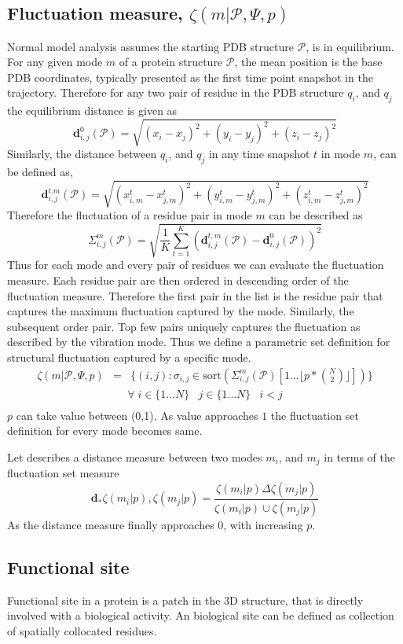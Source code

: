 \documentclass{article}
\begin{document}
\subsection{Fluctuation measure, $\zeta(m \vert \mathscr{P}, \Psi, p)$}
Normal model analysis assumes the starting PDB structure $\mathscr{P}$, is in equilibrium. For any given mode $m$ of a protein structure $\mathscr{P}$, the mean position is the base PDB coordinates, typically presented as the first time point snapshot in the trajectory. Therefore for any two pair of residue in the PDB structure $q_i$, and $q_j$ the equilibrium distance is given as 
\begin{equation*}
    \mathbf{d}^{0}_{i,j}(\mathscr{P}) = \sqrt{ (x_i - x_j)^2 + (y_i-y_j)^2 + (z_i-z_j)^2 }
\end{equation*}
Similarly, the distance between $q_i$, and $q_j$ in any time snapshot $t$ in mode $m$, can be defined as,
\begin{equation*}
    \mathbf{d}^{t.m}_{i,j}(\mathscr{P}) = \sqrt{ (x^{t}_{i,m} - x^{t}_{j,m})^2 + (y^{t}_{i,m} - y^{t}_{j,m})^2 + (z^{t}_{i,m} - z^{t}_{j,m})^2}
\end{equation*}
Therefore the fluctuation of a residue pair in mode $m$ can be described as 
\begin{equation*}
    \Sigma^{m}_{i,j}(\mathscr{P}) = \sqrt{ \dfrac{1}{K} \sum^{K}_{t=1} (\mathbf{d}^{t,m}_{i,j}(\mathscr{P}) - \mathbf{d}^{0}_{i,j}(\mathscr{P}))^2 }
\end{equation*}
 Thus for each mode and every pair of residues we can evaluate the fluctuation measure. Each residue pair are then ordered in descending order of the fluctuation measure. Therefore the first pair in the list is the residue pair that captures the maximum fluctuation captured by the mode. Similarly, the subsequent order pair. Top few pairs uniquely captures the fluctuation as described by the vibration mode. Thus we define a parametric set definition for structural fluctuation captured by a specific mode.
 \begin{eqnarray*}
     \zeta(m \vert \mathscr{P}, \Psi, p) & = & \Big\lbrace (i, j) : \sigma_{i,j} \in \text{sort}(\Sigma^{m}_{i,j}(\mathscr{P})[1 \dots \lfloor p*\binom{N}{2}\rfloor ] )\Big\rbrace 
 \end{eqnarray*}
 \begin{eqnarray*}
     \forall\; i \in \lbrace 1 \dots N \rbrace & j \in \lbrace 1 \dots N \rbrace & i < j   \\
 \end{eqnarray*}
 $p$ can take value between (0,1). As value approaches $1$ the fluctuation set definition for every mode becomes same.
 \par
 Let describes a distance measure between two modes $m_i$, and $m_j$ in terms of the fluctuation set measure
 \begin{equation*}
     \mathbf{d}_{\ast}{\zeta(m_i \vert p), \zeta(m_j \vert p)} = \dfrac{\zeta(m_i\vert p) \Delta \zeta(m_j\vert p)}{\zeta(m_i\vert p) \cup \zeta(m_j\vert p)}
 \end{equation*}
 As the distance measure finally approaches $0$, with increasing $p$. 
 
\subsection{Functional site}
Functional site in a protein is a patch in the 3D structure, that is directly involved with a biological activity. An biological site can be defined as collection of spatially collocated residues. 
\end{document}
